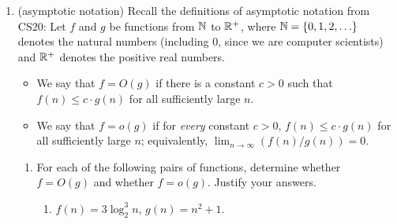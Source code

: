 \documentclass[11pt]{article}
\begin{document}
\begin{enumerate}
\begin{enumerate}
    \item (proofs by induction) Let $t$ be a positive integer that is fixed for this question. Prove that every binary tree $\treeT$ of size at least $2t+1$ has a vertex $\btv$ such that the subtree rooted at $\btv$ has size at least $t$ and at most $2t-1$.  (Hint: use strong induction on the size $n$ of $\treeT$, starting with base case $n=2t+1$.  Remember that nodes in binary trees can have 2, 1, or 0 children.) \label{part:induction-tsize}

    \item (from proofs to algorithms) Turn your proof from Part~\ref{part:induction-tsize} into a Python program \texttt{FindDescendantOfSize(t,v)} that, given a positive integer $\texttt{t}$ and a vertex \texttt{v} of a {\em size-augmented} tree \treeT\ such that $\texttt{v.size}\geq \texttt{2t+1}$, finds and returns a descendant  \texttt{w} of $\texttt{v}$ such that $\texttt{t}\leq \texttt{w.size} \leq \texttt{2t-1}$.   Your algorithm should run in time $O(h)$, where $h$ is the height of the subtree rooted at $\texttt{v}$; explain in words why this is the case.

\end{enumerate}

\item (asymptotic notation) Recall the definitions of asymptotic notation from CS20:
Let $f$ and $g$ be functions from $\mathbb{N}$ to $\mathbb{R}^+$, where $\mathbb{N}=\{0,1,2,\ldots\}$ denotes the natural numbers (including 0, since we are computer scientists) and $\mathbb{R}^+$ denotes the positive real numbers.  
\begin{itemize}
    \item We say that $f=O(g)$ if there is a constant $c>0$ such that $f(n)\leq c\cdot g(n)$ for all sufficiently large $n$. 
    \item We say that $f=o(g)$ if for {\em every} constant $c>0$, $f(n)\leq c\cdot g(n)$ for all sufficiently large $n$; equivalently, $\lim_{n\rightarrow \infty} (f(n)/g(n))=0$.
    
\end{itemize}


\begin{enumerate}
    \item For each of the following pairs of functions, determine whether $f=O(g)$ and whether $f=o(g)$.  Justify your answers.
    \begin{enumerate}
        \item $f(n) = 3\log^3_{2} n$, $g(n) = n^2+1$. 


\end{enumerate}
\end{enumerate}
\end{enumerate}
\end{document}
